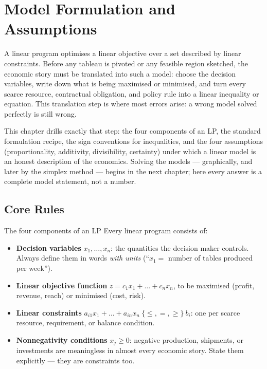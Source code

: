\chapter{Model Formulation and Assumptions}

A linear program optimises a linear
objective over a set described by linear constraints. Before any tableau is
pivoted or any feasible region sketched, the economic story must be
translated into such a model: choose the decision variables, write down what
is being maximised or minimised, and turn every scarce resource, contractual
obligation, and policy rule into a linear inequality or equation. This
translation step is where most errors arise: a wrong model solved
perfectly is still wrong.

This chapter drills exactly that step: the four components of an LP, the
standard formulation recipe, the sign conventions for inequalities, and the
four assumptions (proportionality, additivity, divisibility, certainty)
under which a linear model is an honest description of the economics.
Solving the models — graphically, and later by the simplex method — begins
in the next chapter; here every answer is a complete model statement, not a
number.

\section{Core Rules}

\begin{rulebox}{The four components of an LP}
Every linear program consists of:
\begin{itemize}[leftmargin=1.6em,itemsep=0.3ex]
  \item \textbf{Decision variables}
        $x_1,\dots,x_n$: the quantities the decision maker controls.
        Always define them in words \emph{with units} (``$x_1=$ number of
        tables produced per week'').
  \item \textbf{Linear objective function}
        $z=c_1x_1+\dots+c_nx_n$, to be maximised (profit, revenue, reach)
        or minimised (cost, risk).
  \item \textbf{Linear constraints}
        $a_{i1}x_1+\dots+a_{in}x_n\ \{\le,=,\ge\}\ b_i$: one per scarce
        resource, requirement, or balance condition.
  \item \textbf{Nonnegativity conditions} $x_j\ge 0$: negative
        production, shipments, or investments are meaningless in almost
        every economic story. State them explicitly — they are constraints
        too.
\end{itemize}
\end{rulebox}

